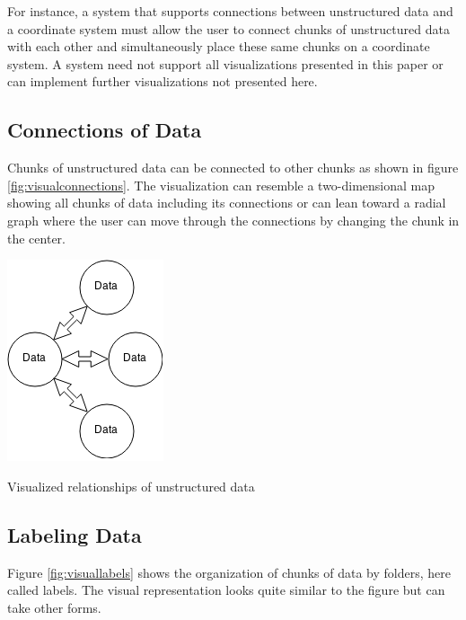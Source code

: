 For instance, a system that supports connections between unstructured data and
a coordinate system must allow the user to connect chunks of unstructured data
with each other and simultaneously place these same chunks on a coordinate system.
A system need not support all visualizations presented in this paper or can
implement further visualizations not presented here.

\subsection{Connections of Data}

Chunks of unstructured data can be connected to other chunks as shown in figure
\ref{fig:visualconnections}. The visualization can resemble a two-dimensional
map showing all chunks of data including its connections or can lean toward a
radial graph where the user can move through the connections by changing the
chunk in the center.

\begin{flfigure}
  \centering
    \includegraphics[width=0.5\linewidth]{00_resources/data_connections.png}
    \caption{Visualized relationships of unstructured data}
  \label{fig:visualconnections}
\end{flfigure}

\subsection{Labeling Data}

Figure \ref{fig:visuallabels} shows the organization of chunks of data by
folders, here called labels. The visual representation looks quite similar to
the figure but can take other forms.

